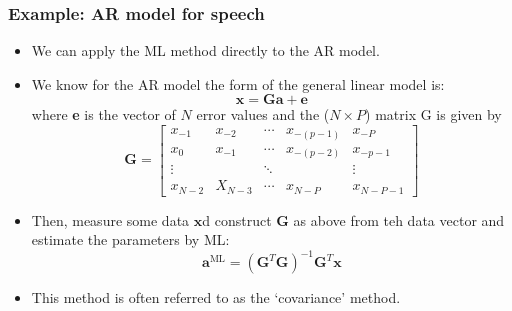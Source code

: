 \documentclass[12pt]{article}
\newcommand{\xb}{\mathbf{x}}
\newcommand{\ml}{\textrm{ML}}
\newcommand{\Gb}{\mathbf{G}}
\begin{document}
\subsubsection{Example: AR model for speech}
\begin{itemize}
    \item We can apply the ML method directly to the AR model.
    \item We know for the AR model the form of the general linear model is:
    \[
    \mathbf{x = Ga +e}
    \]
    where \textbf{e} is the vector of $N$ error values and the ($N\times P$) matrix G is given by 
        \[
        \mathbf{G} = \begin{bmatrix}
        x_{-1} & x_{-2} & \cdots & x_{-(p-1)} & x_{-P}\\
        x_0 & x_{-1} & \cdots & x_{-(p-2)} & x_{-{p-1}} \\
        \vdots & & \ddots & & \vdots \\
        x_{N-2} & X_{N-3} & \cdots & x_{N-P} & x_{N-P-1} 
        \end{bmatrix}
        \]
        \item Then, measure some data $\mathbf{x}$d construct $\Gb$ as above from teh data vector and estimate the parameters by ML:
        \[
        \mathbf{a}^\ml = (\Gb^T\Gb)^{-1}\Gb^T \xb
        \]
        \item This method is often referred to as the `covariance' method. 
\end{itemize}
\end{document}
